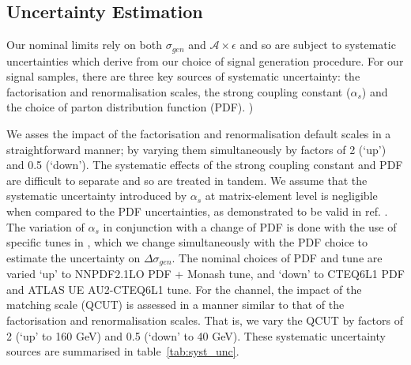 
\subsection{Uncertainty Estimation}
Our nominal limits rely on both $\sigma_{gen}$ and $\mathcal{A}\times\epsilon$ and so are subject to systematic uncertainties which derive from our choice of signal generation procedure. For our signal samples, there are three key sources of systematic uncertainty: the factorisation and renormalisation scales, the strong coupling constant ($\alpha_{s}$) and the choice of parton distribution function (PDF).
)

%
%
We asses the impact of the factorisation and renormalisation default scales in a straightforward manner; by varying them simultaneously by factors of 2 (`up') and 0.5 (`down'). The systematic effects of the strong coupling constant and PDF are difficult to separate and so are treated in tandem. We assume that the systematic uncertainty introduced by $\alpha_{s}$ at matrix-element level is negligible when compared to the PDF uncertainties, as demonstrated to be valid in ref. \cite{CERN-THESIS-2015-038}. The variation of $\alpha_{s}$ in conjunction with a change of PDF is done with the use of specific tunes in \PYTHIA, which we change simultaneously with the PDF choice to estimate the uncertainty on $\Delta \sigma_{gen}$. The nominal choices of PDF and tune are varied `up' to NNPDF2.1LO PDF + Monash tune, and `down' to CTEQ6L1 PDF and ATLAS UE AU2-CTEQ6L1 tune. For the \monojet channel, the impact of the matching scale (QCUT) is assessed in a manner similar to that of the factorisation and renormalisation scales. That is, we vary the QCUT by factors of 2 (`up' to 160 GeV) and 0.5 (`down' to 40 GeV). These systematic uncertainty sources are summarised in table~\ref{tab:syst_unc}.

